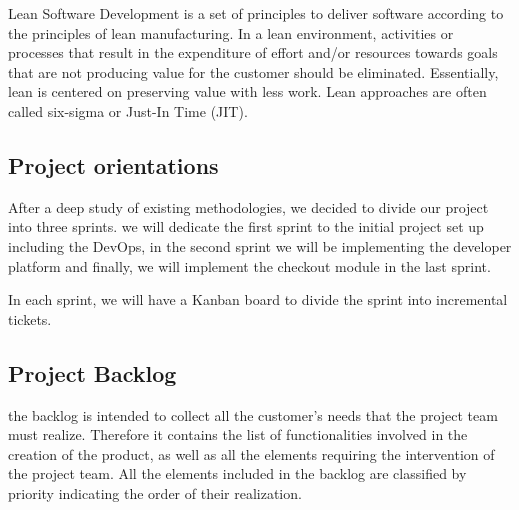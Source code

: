 \begin{spacing}{1.2}
Lean Software Development \cite{lean} is a set of principles to deliver software according to the principles of lean manufacturing. In a lean environment, activities or processes that result in the expenditure of effort and/or resources towards goals that are not producing value for the customer should be eliminated. Essentially, lean is centered on preserving value with less work. Lean approaches are often called six-sigma or Just-In Time (JIT).

\subsection{Project orientations}
After a deep study of existing methodologies, we decided to divide our project into three sprints.
we will dedicate the first sprint to the initial project set up including the DevOps, in the second sprint we will be implementing the developer platform and finally, we will implement the checkout module in the last sprint.

In each sprint, we will have a Kanban board to divide the sprint into incremental tickets.

\subsection{Project Backlog}
the backlog is intended to collect all the customer's needs that the project team must realize. Therefore it contains the list of functionalities involved in the creation of the product, as well as all the elements requiring the intervention of the project team. All the elements included in the backlog are classified by priority indicating the order of their realization.
\newpage





\end{spacing}
